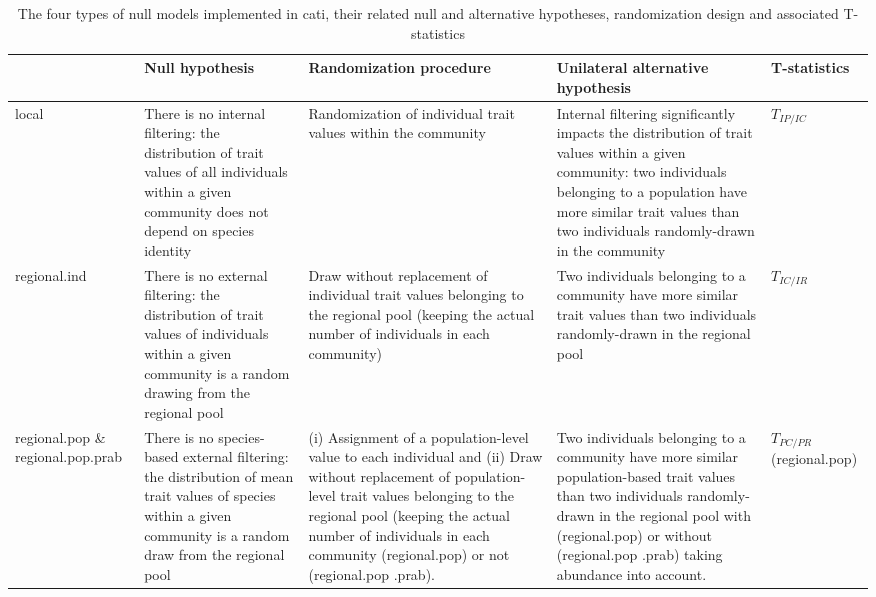 \documentclass[12pt]{article}\usepackage[]{graphicx}\usepackage[]{color}
\begin{document}
  
\begin{landscape}
\begin{table}[h]
\caption[T-statistics and associated null models]{The four types of null models implemented in cati, their related null and alternative hypotheses, randomization design and associated T-statistics}
\begin{tabular}{m{2.7cm} m{5.3cm} m{6.3cm} m{6.2cm} m{2.5cm}}

& Null hypothesis & Randomization procedure & Unilateral alternative hypothesis & T-statistics  \tabularnewline
\hline \hline \hline

local & There is no internal filtering: the distribution of trait values of all individuals within a given community does not depend on species identity & Randomization of individual trait values within the community& Internal filtering significantly impacts the distribution of trait values within a given community: two individuals belonging to a population have more similar trait values than two individuals randomly-drawn in the community & $T_{IP/IC}$   \tabularnewline

\hline

regional.ind  & There is no external filtering: the distribution of trait values of individuals within a given community is a random drawing from the regional pool & Draw without replacement of individual trait values belonging to the regional pool (keeping the actual number of individuals in each community) & Two individuals belonging to a community have more similar trait values than two individuals randomly-drawn in the regional pool & $T_{IC/IR}$\tabularnewline

\hline

regional.pop \& regional.pop.prab & There is no species-based external filtering: the distribution of mean trait values of species within a given community is a random draw from the regional pool & (i) Assignment of a population-level value to each individual and (ii) Draw without replacement of population-level trait values belonging to the regional pool (keeping the actual number of individuals in each community (regional.pop) or not (regional.pop .prab). & Two individuals belonging to a community have more similar population-based trait values than two individuals randomly-drawn in the regional pool with (regional.pop) or without (regional.pop .prab) taking abundance into account. & $T_{PC/PR}$  (regional.pop) \tabularnewline


\end{tabular}
\end{table}
\end{landscape}
\end{document}
